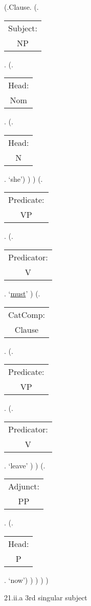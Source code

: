\documentclass[12pt,letterpaper]{article}
\begin{document}
\begin{figure}
	\begin{center}
		\begin{parsetree}
			(.Clause.
			(.\begin{tabular}{c}Subject:\\NP\end{tabular}.  
			(.\begin{tabular}{c}Head:\\Nom\end{tabular}.
			(.\begin{tabular}{c}Head:\\N\end{tabular}. `she')
			)
			)
			(.\begin{tabular}{c}Predicate:\\VP\end{tabular}.
			(.\begin{tabular}{c}Predicator:\\V\end{tabular}.    `\underline{must}' )
			(.\begin{tabular}{c}CatComp:\\Clause\end{tabular}. 
			(.\begin{tabular}{c}Predicate:\\VP\end{tabular}.
			(.\begin{tabular}{c}Predicator:\\V\end{tabular}.    `leave' )
			)
			(.\begin{tabular}{c}Adjunct:\\PP\end{tabular}. 
			(.\begin{tabular}{c}Head:\\P\end{tabular}. `now')
			)
			)
			)
			)
			
		\end{parsetree}
		\hfill \break \hfill \break
		21.ii.a 3rd singular subject
	\end{center}
\end{figure}
\end{document}
